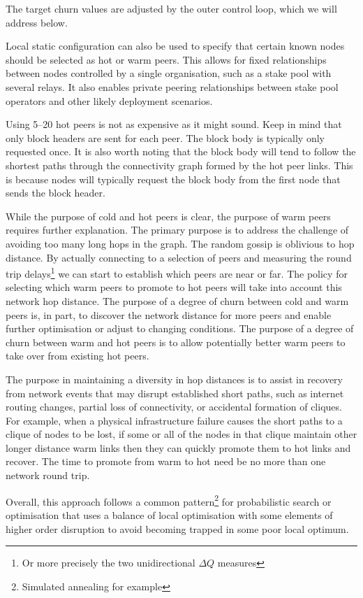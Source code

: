\documentclass[11pt,a4paper]{article}
\begin{document}
The target churn values are adjusted by the outer control loop, which we
will address below.

Local static configuration can also be used to specify that certain
known nodes should be selected as hot or warm peers. This allows for
fixed relationships between nodes controlled by a single organisation,
such as a stake pool with several relays. It also enables private
peering relationships between stake pool operators and other likely
deployment scenarios.

Using 5--20 hot peers is not as expensive as it might sound. Keep in
mind that only block headers are sent for each peer. The block body is
typically only requested once. It is also worth noting that the block
body will tend to follow the shortest paths through the connectivity
graph formed by the hot peer links. This is because nodes will typically
request the block body from the first node that sends the block header.

While the purpose of cold and hot peers is clear, the purpose of warm
peers requires further explanation. The primary purpose is to address
the challenge of avoiding too many long hops in the graph. The random
gossip is oblivious to hop distance. By actually connecting to a
selection of peers and measuring the round trip delays\footnote{Or more
  precisely the two unidirectional $\Delta{}Q$ measures} we can start to
establish which peers are near or far. The policy for selecting which
warm peers to promote to hot peers will take into account this network
hop distance. The purpose of a degree of churn between cold and warm
peers is, in part, to discover the network distance for more peers and
enable further optimisation or adjust to changing conditions. The
purpose of a degree of churn between warm and hot peers is to allow
potentially better warm peers to take over from existing hot peers.

The purpose in maintaining a diversity in hop distances is to assist in
recovery from network events that may disrupt established short paths,
such as internet routing changes, partial loss of connectivity, or
accidental formation of cliques. For example, when a physical
infrastructure failure causes the short paths to a clique of nodes to be
lost, if some or all of the nodes in that clique maintain other longer
distance warm links then they can quickly promote them to hot links and
recover. The time to promote from warm to hot need be no more than one
network round trip.

Overall, this approach follows a common pattern\footnote{Simulated
  annealing for example} for probabilistic search or optimisation that
uses a balance of local optimisation with some elements of higher order
disruption to avoid becoming trapped in some poor local optimum.
\end{document}
